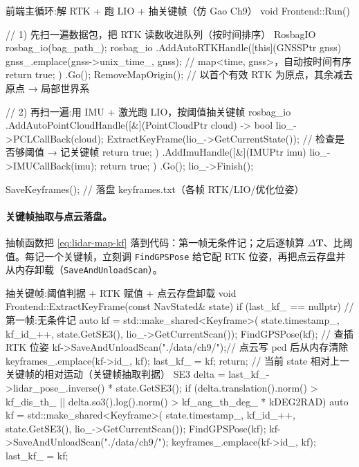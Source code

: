 \begin{codebox}[C++]{前端主循环:解 RTK + 跑 LIO + 抽关键帧（仿 Gao Ch9）}
void Frontend::Run() {
  // 1) 先扫一遍数据包，把 RTK 读数收进队列（按时间排序）
  RosbagIO rosbag_io(bag_path_);
  rosbag_io
    .AddAutoRTKHandle([this](GNSSPtr gnss) {
      gnss_.emplace(gnss->unix_time_, gnss);   // map<time, gnss>，自动按时间有序
      return true;
    })
    .Go();
  RemoveMapOrigin();   // 以首个有效 RTK 为原点，其余减去原点 → 局部世界系

  // 2) 再扫一遍:用 IMU + 激光跑 LIO，按阈值抽关键帧
  rosbag_io
    .AddAutoPointCloudHandle([&](PointCloudPtr cloud) -> bool {
      lio_->PCLCallBack(cloud);
      ExtractKeyFrame(lio_->GetCurrentState());   // 检查是否够阈值 → 记关键帧
      return true;
    })
    .AddImuHandle([&](IMUPtr imu) {
      lio_->IMUCallBack(imu);
      return true;
    })
    .Go();
  lio_->Finish();

  SaveKeyframes();   // 落盘 keyframes.txt（各帧 RTK/LIO/优化位姿）
}
\end{codebox}

\paragraph{关键帧抽取与点云落盘。}
抽帧函数把 \cref{eq:lidar-map-kf} 落到代码：第一帧无条件记；之后逐帧算 $\Delta\mathbf{T}$、比阈值。每记一个关键帧，立刻调 \texttt{FindGPSPose} 给它配 RTK 位姿，再把点云存盘并从内存卸载（\texttt{SaveAndUnloadScan}）。

\begin{codebox}[C++]{抽关键帧:阈值判据 + RTK 赋值 + 点云存盘卸载}
void Frontend::ExtractKeyFrame(const NavStated& state) {
  if (last_kf_ == nullptr) {             // 第一帧:无条件记
    auto kf = std::make_shared<Keyframe>(
        state.timestamp_, kf_id_++, state.GetSE3(), lio_->GetCurrentScan());
    FindGPSPose(kf);                     // 查插 RTK 位姿
    kf->SaveAndUnloadScan("./data/ch9/");// 点云写 pcd 后从内存清除
    keyframes_.emplace(kf->id_, kf);
    last_kf_ = kf;
    return;
  }
  // 当前 state 相对上一关键帧的相对运动（关键帧抽取判据）
  SE3 delta = last_kf_->lidar_pose_.inverse() * state.GetSE3();
  if (delta.translation().norm() > kf_dis_th_ ||
      delta.so3().log().norm() > kf_ang_th_deg_ * kDEG2RAD) {
    auto kf = std::make_shared<Keyframe>(
        state.timestamp_, kf_id_++, state.GetSE3(), lio_->GetCurrentScan());
    FindGPSPose(kf);
    kf->SaveAndUnloadScan("./data/ch9/");
    keyframes_.emplace(kf->id_, kf);
    last_kf_ = kf;
  }
}
\end{codebox}

